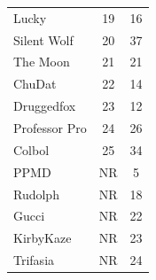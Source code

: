 \documentclass[10pt]{article}
\theoremstyle{definition}
\theoremstyle{remark}
\begin{document}
\begin{table}[!ht]
{\begin{tabular}{lcc}
    Lucky           & 19                     & 16       \\
    Silent Wolf     & 20                     & 37       \\
    The Moon        & 21                     & 21       \\
    ChuDat          & 22                     & 14       \\
    Druggedfox      & 23                     & 12       \\
    Professor Pro   & 24                     & 26       \\
    Colbol          & 25                     & 34       \\
    PPMD            & NR                     & 5        \\
    Rudolph         & NR                     & 18       \\
    Gucci           & NR                     & 22       \\
    KirbyKaze       & NR                     & 23       \\
    Trifasia        & NR                     & 24       \\
    \end{tabular}
    }
\end{table}
\end{document}

